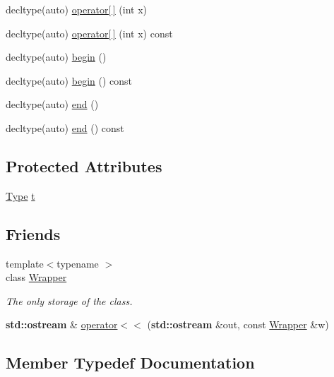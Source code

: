 \begin{DoxyCompactItemize}
\item 
decltype(auto) \hyperlink{structhandy_1_1Wrapper_ac0c37995310c911470c3dec9fcc08798}{operator\mbox{[}$\,$\mbox{]}} (int x)
\item 
decltype(auto) \hyperlink{structhandy_1_1Wrapper_afbd667206c2669c577716b8520a8a9c7}{operator\mbox{[}$\,$\mbox{]}} (int x) const 
\item 
decltype(auto) \hyperlink{structhandy_1_1Wrapper_a60be5adc0dc48777d0cb69acdcd77353}{begin} ()
\item 
decltype(auto) \hyperlink{structhandy_1_1Wrapper_a8b6b978ea6d152ea9e44054bc4ef780e}{begin} () const 
\item 
decltype(auto) \hyperlink{structhandy_1_1Wrapper_a6f3b92123962e048062e5cced4d38af4}{end} ()
\item 
decltype(auto) \hyperlink{structhandy_1_1Wrapper_a0c7e965faf6193d8d85c8c80d4b6a0a2}{end} () const 
\end{DoxyCompactItemize}
\subsection*{Protected Attributes}
\begin{DoxyCompactItemize}
\item 
\hyperlink{structhandy_1_1Wrapper_a877565c213a6ed7c404dee887a5783e4}{Type} \hyperlink{structhandy_1_1Wrapper_a5ac97b2a85fe9e4cc066766bdbaf75e5}{t}
\end{DoxyCompactItemize}
\subsection*{Friends}
\begin{DoxyCompactItemize}
\item 
{\footnotesize template$<$typename $>$ }\\class \hyperlink{structhandy_1_1Wrapper_af0ee8fe701d964b31d6a6f269085bf54}{Wrapper}
\begin{DoxyCompactList}\small\item\em The only storage of the class. \end{DoxyCompactList}\item 
{\bf std\+::ostream} \& \hyperlink{structhandy_1_1Wrapper_ae28a2cf6891581897477c5ad3d1a3bc4}{operator$<$$<$} ({\bf std\+::ostream} \&out, const \hyperlink{structhandy_1_1Wrapper}{Wrapper} \&w)
\end{DoxyCompactItemize}


\subsection{Member Typedef Documentation}
